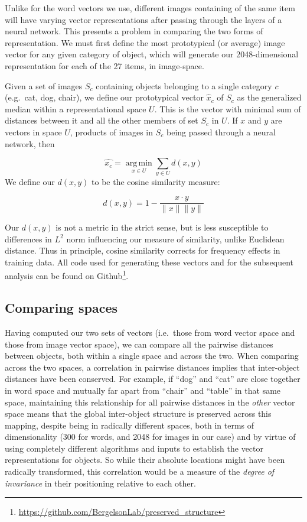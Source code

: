 \documentclass[10pt, letterpaper]{article}
\begin{document}
Unlike for the word vectors we use, different images containing of the
same item will have varying vector representations after passing through
the layers of a neural network. This presents a problem in comparing the
two forms of representation. We must first define the most prototypical
(or average) image vector for any given category of object, which will
generate our 2048-dimensional representation for each of the 27 items,
in image-space.

Given a set of images \(S_c\) containing objects belonging to a single
category \(c\) (e.g.~cat, dog, chair), we define our prototypical vector
\(\hat{x}_c\) of \(S_c\) as the generalized median within a
representational space \(U\). This is the vector with minimal sum of
distances between it and all the other members of set \(S_c\) in \(U\).
If \(x\) and \(y\) are vectors in space \(U\), products of images in
\(S_c\) being passed through a neural network, then

\[
 \hat{x_c} = \operatorname*{arg\,min}_{x\in U} \sum_{y\in U} d(x, y)
\] We define our \(d(x, y)\) to be the cosine similarity measure:

\[
d(x, y) = 1 - \frac{x\cdot y}{\|x\|\|y\|}
\]

Our \(d(x, y)\) is not a metric in the strict sense, but is less
susceptible to differences in \(L^2\) norm influencing our measure of
similarity, unlike Euclidean distance. Thus in principle, cosine
similarity corrects for frequency effects in training data. All code
used for generating these vectors and for the subsequent analysis can be
found on
Github\footnote{\url{https://github.com/BergelsonLab/preserved_structure}}.

\subsection{Comparing spaces}\label{comparing-spaces}

Having computed our two sets of vectors (i.e.~those from word vector
space and those from image vector space), we can compare all the
pairwise distances between objects, both within a single space and
across the two. When comparing across the two spaces, a correlation in
pairwise distances implies that inter-object distances have been
conserved. For example, if ``dog'' and ``cat'' are close together in
word space and mutually far apart from ``chair'' and ``table'' in that
same space, maintaining this relationship for all pairwise distances in
the \textit{other} vector space means that the global inter-object
structure is preserved across this mapping, despite being in radically
different spaces, both in terms of dimensionality (300 for words, and
2048 for images in our case) and by virtue of using completely different
algorithms and inputs to establish the vector representations for
objects. So while their absolute locations might have been radically
transformed, this correlation would be a measure of the
\textit{degree of invariance} in their positioning relative to each
other.
\end{document}
